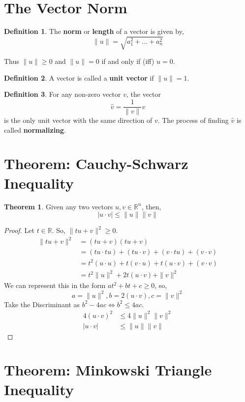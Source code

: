 \documentclass{report}
\theoremstyle{definition}
\newtheorem*{_def}{Definition}
\newtheorem{_thm}{Theorem}[section]
\theoremstyle{remark}
\begin{document}
\section{The Vector Norm}

\begin{_def}
The \textbf{norm} or \textbf{length} of a vector is given by,
\[\|u\|=\sqrt{a^2_1+...+a^2_n}\]
\end{_def}

Thus \(\|u\|\geq 0\) and \(\|u\|=0\) if and only if (iff) \(u=0\).

\begin{_def}
A vector is called a \textbf{unit vector} if \(\|u\|=1\).
\end{_def}

\begin{_def}
For any non-zero vector \(v\), the vector 
\[\hat{v}=\frac{1}{\|v\|} v\]
is the only unit vector with the same direction of $v$.
The process of finding \(\hat{v}\) is called \textbf{normalizing}.
\end{_def}

\section{Theorem: Cauchy-Schwarz Inequality}

\begin{_thm}
Given any two vectors \(u,v\in \mathbb{R}^n\), then,
\[|u\cdot v|\leq \|u\|\|v\|\]
\end{_thm}

\begin{proof}
Let \(t\in \mathbb{R}\). So, \(\|tu+v\|^2\geq 0\).
\begin{align*}
\|tu+v\|^2 &= (tu+v)(tu+v) \\
&= (tu\cdot tu)+(tu\cdot v)+(v\cdot tu)+(v\cdot v) \\
&= t^2(u\cdot u)+t(v\cdot u)+t(u\cdot v)+(v\cdot v) \\
&= t^2\|u\|^2+2t(u\cdot v)+\|v\|^2
\end{align*}
We can represent this in the form \(at^2+bt+c\geq 0\), so,
\[a=\|u\|^2, b=2(u\cdot v), c=\|v\|^2\]
Take the Discriminant as \(b^2-4ac\iff b^2\leq 4ac\).
\begin{align*}
4(u\cdot v)^2 &\leq 4\|u\|^2\|v\|^2 \\
|u\cdot v| &\leq \|u\|\|v\|
\end{align*}
\end{proof}

\section{Theorem: Minkowski Triangle Inequality}
\end{document}
